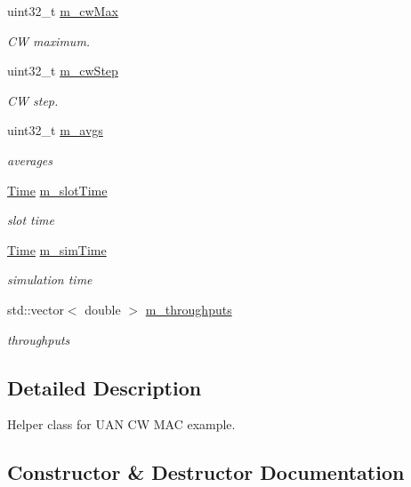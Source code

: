 \begin{DoxyCompactItemize}
uint32\+\_\+t \hyperlink{classNetAnimExperiment_a36377073bd491b2213fd752da30e9362}{m\+\_\+cw\+Max}
\begin{DoxyCompactList}\small\item\em CW maximum. \end{DoxyCompactList}\item 
uint32\+\_\+t \hyperlink{classNetAnimExperiment_aca23676d0e5f1c69a82cea6d8d8af784}{m\+\_\+cw\+Step}
\begin{DoxyCompactList}\small\item\em CW step. \end{DoxyCompactList}\item 
uint32\+\_\+t \hyperlink{classNetAnimExperiment_aa5c4b8cecba30d0e970bd1ea1625af05}{m\+\_\+avgs}
\begin{DoxyCompactList}\small\item\em averages \end{DoxyCompactList}\item 
\hyperlink{classns3_1_1Time}{Time} \hyperlink{classNetAnimExperiment_a8775f236cd5acfc6d68139e14d58f342}{m\+\_\+slot\+Time}
\begin{DoxyCompactList}\small\item\em slot time \end{DoxyCompactList}\item 
\hyperlink{classns3_1_1Time}{Time} \hyperlink{classNetAnimExperiment_a647b3bc58c546fceefa722338e49db0a}{m\+\_\+sim\+Time}
\begin{DoxyCompactList}\small\item\em simulation time \end{DoxyCompactList}\item 
std\+::vector$<$ double $>$ \hyperlink{classNetAnimExperiment_a1fd810b388bb85c8c2e622c914ef5d03}{m\+\_\+throughputs}
\begin{DoxyCompactList}\small\item\em throughputs \end{DoxyCompactList}\end{DoxyCompactItemize}


\subsection{Detailed Description}
Helper class for U\+AN CW M\+AC example. 

\subsection{Constructor \& Destructor Documentation}
